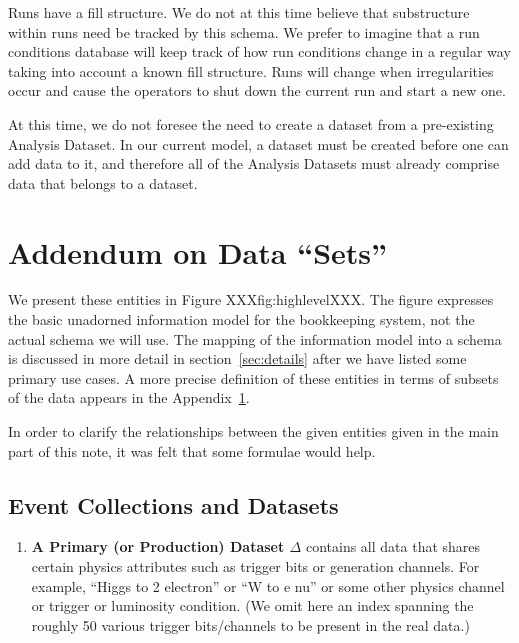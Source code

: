 \documentclass[pdftex]{cmspaper}
\begin{document}
{Runs have a fill structure.  We do not at this time believe that
substructure within runs need be tracked by this schema.  We prefer
to imagine that a run conditions database will keep track of how run
conditions change in a regular way taking into account a known fill
structure.  Runs will change when irregularities occur and cause the
operators to shut down the current run and start a new one.

At this time, we do not foresee the need to create a dataset from a
pre-existing Analysis Dataset.  In our current model, a dataset must be
created before one can add data to it, and therefore all of the Analysis
Datasets must already comprise data that belongs to a dataset.


\appendix



\section{Addendum on Data ``Sets''}\label{appendix}




We present these entities in Figure XXXfig:highlevelXXX.
The figure expresses the basic unadorned information model
for the bookkeeping system, not the actual schema we will use.
The mapping of the information model into a schema is discussed in more
detail in section~\ref{sec:details} after we have listed some primary use
cases.  A more precise definition of these entities in terms of subsets of
the data appears in the Appendix~\ref{appendix}.



In order to clarify the relationships between the given entities given
in the main part of this note, it was felt that some formulae would help.

\subsection{Event Collections and Datasets}

\begin{enumerate}

\item {\bf A Primary (or Production) Dataset $\Delta$} 
      contains all data that shares certain physics attributes such as
      trigger bits or generation channels.  For example, ``Higgs to
      2 electron'' or ``W to e nu'' or some other physics channel or
      trigger or luminosity condition.  (We omit here an index spanning
      the roughly 50 various trigger bits/channels to be present in the
      real data.)


\end{enumerate}}
\end{document}
